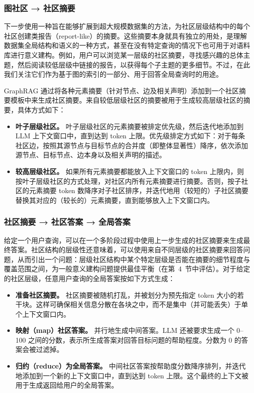 \documentclass[11pt,UTF8,fontset=fandol]{ctexart}
\begin{document}
\subsubsection{图社区 → 社区摘要}

下一步使用一种旨在能够扩展到超大规模数据集的方法，为社区层级结构中的每个社区创建类报告（report-like）的摘要。这些摘要本身就具有独立的用处，是理解数据集全局结构和语义的一种方式，甚至在没有特定查询的情况下也可用于对语料库进行意义建构。例如，用户可以浏览某一层级的社区摘要，寻找感兴趣的总体主题，然后阅读较低层级中链接的报告，以获得每个子主题的更多细节。不过，在此我们关注它们作为基于图的索引的一部分、用于回答全局查询时的用途。

GraphRAG 通过将各种元素摘要（针对节点、边及相关声明）添加到一个社区摘要模板中来生成社区摘要。来自较低层级社区的摘要被用于生成较高层级社区的摘要，具体方式如下：

\begin{itemize}[leftmargin=2em]
\item \textbf{叶子层级社区。} 叶子层级社区的元素摘要被排定优先级，然后迭代地添加到 LLM 上下文窗口中，直到达到 token 上限。优先级排定方式如下：对于每条社区边，按照其源节点与目标节点的合并度（即整体显著性）降序，依次添加源节点、目标节点、边本身以及相关声明的描述。
\item \textbf{较高层级社区。} 如果所有元素摘要都能放入上下文窗口的 token 上限内，则按叶子层级社区的方式处理，对社区内所有元素摘要进行摘要。否则，按子社区的元素摘要 token 数降序对子社区排序，并迭代地用（较短的）子社区摘要替换其对应的（较长的）元素摘要，直到能够放入上下文窗口内。
\end{itemize}

\subsubsection{社区摘要 → 社区答案 → 全局答案}

给定一个用户查询，可以在一个多阶段过程中使用上一步生成的社区摘要来生成最终答案。社区结构的层级性还意味着，可以使用来自不同层级的社区摘要来回答问题，从而引出一个问题：层级社区结构中某个特定层级是否能在摘要的细节程度与覆盖范围之间，为一般意义建构问题提供最佳平衡（在第~4~节中评估）。对于给定的社区层级，任意用户查询的全局答案按如下方式生成：

\begin{itemize}[leftmargin=2em]
\item \textbf{准备社区摘要。} 社区摘要被随机打乱，并被划分为预先指定 token 大小的若干块。这样可确保相关信息分散在各块之中，而不是集中（并可能丢失）于单个上下文窗口内。
\item \textbf{映射（map）社区答案。} 并行地生成中间答案。LLM 还被要求生成一个 0--100 之间的分数，表示所生成答案对回答目标问题的帮助程度。分数为 0 的答案会被过滤掉。
\item \textbf{归约（reduce）为全局答案。} 中间社区答案按帮助度分数降序排列，并迭代地添加到一个新的上下文窗口中，直到达到 token 上限。这个最终的上下文被用于生成返回给用户的全局答案。
\end{itemize}
\end{document}
